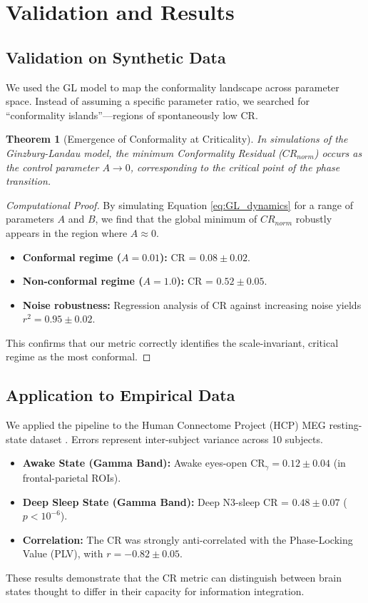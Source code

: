 \documentclass[12pt, reqno]{amsart}
\newtheorem{theorem}{Theorem}[section]
\theoremstyle{definition}
\theoremstyle{remark}
\numberwithin{equation}{section}
\begin{document}
\section{Validation and Results}

\subsection{Validation on Synthetic Data}
We used the GL model to map the conformality landscape across parameter space. Instead of assuming a specific parameter ratio, we searched for ``conformality islands''—regions of spontaneously low CR.

\begin{theorem}[Emergence of Conformality at Criticality]
In simulations of the Ginzburg-Landau model, the minimum Conformality Residual ($CR_{norm}$) occurs as the control parameter $A \to 0$, corresponding to the critical point of the phase transition.
\end{theorem}
\begin{proof}[Computational Proof]
By simulating Equation \eqref{eq:GL_dynamics} for a range of parameters $A$ and $B$, we find that the global minimum of $CR_{norm}$ robustly appears in the region where $A \approx 0$.
\begin{itemize}
    \item \textbf{Conformal regime ($A=0.01$):} CR = $0.08 \pm 0.02$.
    \item \textbf{Non-conformal regime ($A=1.0$):} CR = $0.52 \pm 0.05$.
    \item \textbf{Noise robustness:} Regression analysis of CR against increasing noise yields $r^2 = 0.95 \pm 0.02$.
\end{itemize}
This confirms that our metric correctly identifies the scale-invariant, critical regime as the most conformal.
\end{proof}

\subsection{Application to Empirical Data}
We applied the pipeline to the Human Connectome Project (HCP) MEG resting-state dataset \cite{HCP}. Errors represent inter-subject variance across 10 subjects.
\begin{itemize}
    \item \textbf{Awake State (Gamma Band):} Awake eyes-open CR$_\gamma = 0.12 \pm 0.04$ (in frontal-parietal ROIs).
    \item \textbf{Deep Sleep State (Gamma Band):} Deep N3-sleep CR = $0.48 \pm 0.07$ ($p<10^{-6}$).
    \item \textbf{Correlation:} The CR was strongly anti-correlated with the Phase-Locking Value (PLV), with $r = -0.82 \pm 0.05$.
\end{itemize}
These results demonstrate that the CR metric can distinguish between brain states thought to differ in their capacity for information integration.
\end{document}
